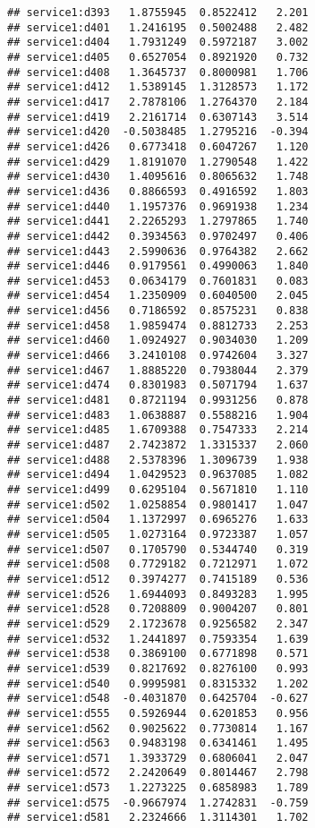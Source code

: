 \documentclass[
]{article}
\begin{document}
\begin{verbatim}
## service1:d393   1.8755945  0.8522412   2.201
## service1:d401   1.2416195  0.5002488   2.482
## service1:d404   1.7931249  0.5972187   3.002
## service1:d405   0.6527054  0.8921920   0.732
## service1:d408   1.3645737  0.8000981   1.706
## service1:d412   1.5389145  1.3128573   1.172
## service1:d417   2.7878106  1.2764370   2.184
## service1:d419   2.2161714  0.6307143   3.514
## service1:d420  -0.5038485  1.2795216  -0.394
## service1:d426   0.6773418  0.6047267   1.120
## service1:d429   1.8191070  1.2790548   1.422
## service1:d430   1.4095616  0.8065632   1.748
## service1:d436   0.8866593  0.4916592   1.803
## service1:d440   1.1957376  0.9691938   1.234
## service1:d441   2.2265293  1.2797865   1.740
## service1:d442   0.3934563  0.9702497   0.406
## service1:d443   2.5990636  0.9764382   2.662
## service1:d446   0.9179561  0.4990063   1.840
## service1:d453   0.0634179  0.7601831   0.083
## service1:d454   1.2350909  0.6040500   2.045
## service1:d456   0.7186592  0.8575231   0.838
## service1:d458   1.9859474  0.8812733   2.253
## service1:d460   1.0924927  0.9034030   1.209
## service1:d466   3.2410108  0.9742604   3.327
## service1:d467   1.8885220  0.7938044   2.379
## service1:d474   0.8301983  0.5071794   1.637
## service1:d481   0.8721194  0.9931256   0.878
## service1:d483   1.0638887  0.5588216   1.904
## service1:d485   1.6709388  0.7547333   2.214
## service1:d487   2.7423872  1.3315337   2.060
## service1:d488   2.5378396  1.3096739   1.938
## service1:d494   1.0429523  0.9637085   1.082
## service1:d499   0.6295104  0.5671810   1.110
## service1:d502   1.0258854  0.9801417   1.047
## service1:d504   1.1372997  0.6965276   1.633
## service1:d505   1.0273164  0.9723387   1.057
## service1:d507   0.1705790  0.5344740   0.319
## service1:d508   0.7729182  0.7212971   1.072
## service1:d512   0.3974277  0.7415189   0.536
## service1:d526   1.6944093  0.8493283   1.995
## service1:d528   0.7208809  0.9004207   0.801
## service1:d529   2.1723678  0.9256582   2.347
## service1:d532   1.2441897  0.7593354   1.639
## service1:d538   0.3869100  0.6771898   0.571
## service1:d539   0.8217692  0.8276100   0.993
## service1:d540   0.9995981  0.8315332   1.202
## service1:d548  -0.4031870  0.6425704  -0.627
## service1:d555   0.5926944  0.6201853   0.956
## service1:d562   0.9025622  0.7730814   1.167
## service1:d563   0.9483198  0.6341461   1.495
## service1:d571   1.3933729  0.6806041   2.047
## service1:d572   2.2420649  0.8014467   2.798
## service1:d573   1.2273225  0.6858983   1.789
## service1:d575  -0.9667974  1.2742831  -0.759
## service1:d581   2.2324666  1.3114301   1.702

\end{verbatim}
\end{document}

